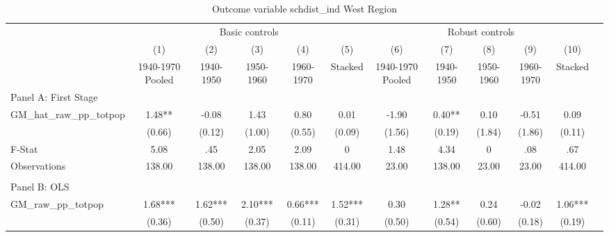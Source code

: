  \begin{table}[htbp]\centering {} \begin{threeparttable} \caption{Outcome variable schdist\_ind West Region} \begin{tabular}{l*{11}{c}} \toprule
          &\multicolumn{5}{c}{Basic controls}                                   &\multicolumn{5}{c}{Robust controls}                                  \\\cmidrule(lr){2-6}\cmidrule(lr){7-11}
          &\multicolumn{1}{c}{(1)}&\multicolumn{1}{c}{(2)}&\multicolumn{1}{c}{(3)}&\multicolumn{1}{c}{(4)}&\multicolumn{1}{c}{(5)}&\multicolumn{1}{c}{(6)}&\multicolumn{1}{c}{(7)}&\multicolumn{1}{c}{(8)}&\multicolumn{1}{c}{(9)}&\multicolumn{1}{c}{(10)}\\
          &\multicolumn{1}{c}{1940-1970 Pooled}&\multicolumn{1}{c}{1940-1950}&\multicolumn{1}{c}{1950-1960}&\multicolumn{1}{c}{1960-1970}&\multicolumn{1}{c}{Stacked}&\multicolumn{1}{c}{1940-1970 Pooled}&\multicolumn{1}{c}{1940-1950}&\multicolumn{1}{c}{1950-1960}&\multicolumn{1}{c}{1960-1970}&\multicolumn{1}{c}{Stacked}\\
\cmidrule(lr){1-11}
\multicolumn{10}{l}{Panel A: First Stage}\\
\cmidrule(lr){1-11}
GM\_hat\_raw\_pp\_totpop&      1.48** &     -0.08   &      1.43   &      0.80   &      0.01   &     -1.90   &      0.40** &      0.10   &     -0.51   &      0.09   \\
          &    (0.66)   &    (0.12)   &    (1.00)   &    (0.55)   &    (0.09)   &    (1.56)   &    (0.19)   &    (1.84)   &    (1.86)   &    (0.11)   \\
\midrule
F-Stat    &      5.08   &       .45   &      2.05   &      2.09   &         0   &      1.48   &      4.34   &         0   &       .08   &       .67   \\
Observations&    138.00   &    138.00   &    138.00   &    138.00   &    414.00   &     23.00   &    138.00   &     23.00   &     23.00   &    414.00   \\
\cmidrule[\heavyrulewidth](lr){1-11} \\ \cmidrule[\heavyrulewidth](lr){1-11}
\multicolumn{10}{l}{Panel B: OLS}\\
\cmidrule(lr){1-11}
GM\_raw\_pp\_totpop&      1.68***&      1.62***&      2.10***&      0.66***&      1.52***&      0.30   &      1.28** &      0.24   &     -0.02   &      1.06***\\
          &    (0.36)   &    (0.50)   &    (0.37)   &    (0.11)   &    (0.31)   &    (0.50)   &    (0.54)   &    (0.60)   &    (0.18)   &    (0.19)   \\

\end{tabular}
\end{threeparttable}
\end{table}
